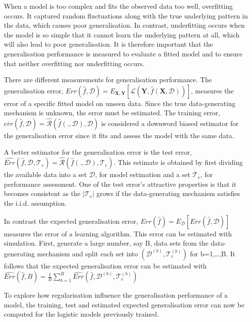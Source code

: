 \documentclass[11pt]{article}
\begin{document}
When a model is too complex and fits the observed data too well,
overfitting occurs. It captured random fluctuations along with the true
underlying pattern in the data, which causes poor generalisation. In
contrast, underfitting occurs when the model is so simple that it cannot
learn the underlying pattern at all, which will also lead to poor
generalisation. It is therefore important that the generalisation
performance is measured to evaluate a fitted model and to ensure that
neither overfitting nor underfitting occurs.

There are different measurements for generalisation performance. The
generalisation error,
\(Err(\hat{f},\mathcal{D})=E_{\mathbf{X,Y}}[\mathcal{L}(\mathbf{Y},\hat{f}(\mathbf{X},\mathcal{D}))]\),
measures the error of a specific fitted model on unseen data. Since the
true data-generating mechanism is unknown, the error must be estimated.
The training error,
\(\bar{err}(\hat{f},\mathcal{D})=\hat{\mathcal{R}}(\hat{f}(.,\mathcal{D}),\mathcal{D})\)
is considered a downword biased estimator for the generalisation error
since it fits and assess the model with the same data.

A better estimator for the generalisation error is the test error,
\(\hat{Err}(\hat{f},\mathcal{D},\mathcal{T}_e)=\hat{\mathcal{R}}(\hat{f}(.,\mathcal{D}),\mathcal{T}_e)\).
This estimate is obtained by first dividing the available data into a
set \(\mathcal{D}\), for model estimation and a set \(\mathcal{T}_e\),
for performance assessment. One of the test error's attractive
properties is that it becomes consistent as the \(|\mathcal{T}_e|\)
grows if the data-generating mechanism satisfies the i.i.d. assumption.

In contrast the expected generalisation error,
\(Err(\hat{f})=E_{\mathcal{D}}[Err(\hat{f},\mathcal{D})]\) measures the
error of a learning algorithm. This error can be estimated with
simulation. First, generate a large number, say B, data sets from the
data-generating mechanism and split each set into
\((\mathcal{D}^{(b)},\mathcal{T}_e^{(b)})\) for b=1,\ldots,B. It follows
that the expected generalisation error can be estimated with
\(\hat{Err}(\hat{f},B)=\frac{1}{B}\sum^B_{b=1}\hat{Err}(\hat{f},\mathcal{D}^{(b)},\mathcal{T}_e^{(b)})\)

To explore how regularisation influence the generalisation performance
of a model, the training, test and estimated expected generalisation
error can now be computed for the logistic models previously trained.
\end{document}
